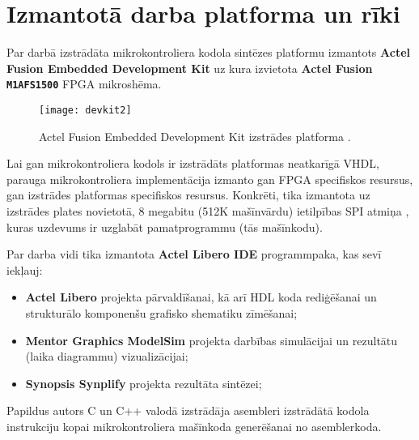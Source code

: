 \section{Izmantotā darba platforma un rīki} \label{sec:devkit}
Par darbā izstrādāta mikrokontroliera kodola sintēzes platformu izmantots
\textbf{Actel Fusion Embedded Development Kit} uz kura izvietota
\textbf{Actel Fusion \texttt{M1AFS1500}} FPGA mikroshēma.

\begin{figure}[thb]
	\centering
	\texttt{[image: devkit2]}
	\caption[Actel Fusion Embedded Development Kit izstrādes platforma.]
			{Actel Fusion Embedded Development Kit izstrādes platforma \cite[7.~lpp.]{FusionGuide}.}
	\label{fig:devkit}
\end{figure}

Lai gan mikrokontroliera kodols ir izstrādāts platformas neatkarīgā VHDL,
parauga mikrokontroliera implementācija izmanto gan FPGA specifiskos
resursus, gan izstrādes platformas specifiskos resursus. Konkrēti, tika
izmantota uz izstrādes plates novietotā, 8 megabitu (512K mašīnvārdu)
ietilpības SPI  atmiņa \cite{FusionGuide}, kuras uzdevums ir uzglabāt 
pamatprogrammu (tās mašīnkodu).

Par darba vidi tika izmantota \textbf{Actel Libero IDE} programmpaka, kas
sevī iekļauj:
\begin{itemize}
	\item \textbf{Actel Libero} projekta pārvaldīšanai,
		kā arī HDL koda rediģēšanai un strukturālo komponenšu 
		grafisko shematiku zīmēšanai;
	\item \textbf{Mentor Graphics ModelSim} projekta darbības simulācijai
		un rezultātu (laika diagrammu) vizualizācijai;
	\item \textbf{Synopsis Synplify} projekta rezultāta sintēzei;
\end{itemize}

Papildus autors C un C++ valodā izstrādāja asembleri
 izstrādātā kodola instrukciju kopai mikrokontroliera mašīnkoda
 generēšanai no asemblerkoda.
